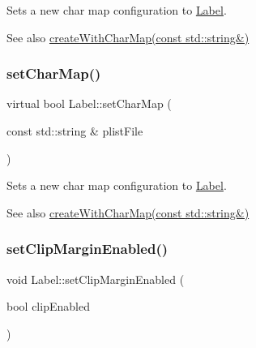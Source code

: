 Sets a new char map configuration to \hyperlink{classLabel}{Label}.

\begin{DoxySeeAlso}{See also}
{\ttfamily \hyperlink{classLabel_a169b27372e6b30d70651a01ff561df5d}{create\+With\+Char\+Map(const std\+::string\&)}} 
\end{DoxySeeAlso}
\mbox{\label{classLabel_a7b1ed3468c3144c2813d3270d1cf269b}} 
\subsubsection{\texorpdfstring{set\+Char\+Map()}{setCharMap()}\hspace{0.1cm}{\footnotesize\ttfamily [6/6]}}
{\footnotesize\ttfamily virtual bool Label\+::set\+Char\+Map (\begin{DoxyParamCaption}\item[{const std\+::string \&}]{plist\+File }\end{DoxyParamCaption})\hspace{0.3cm}{\ttfamily [virtual]}}

Sets a new char map configuration to \hyperlink{classLabel}{Label}.

\begin{DoxySeeAlso}{See also}
{\ttfamily \hyperlink{classLabel_a169b27372e6b30d70651a01ff561df5d}{create\+With\+Char\+Map(const std\+::string\&)}} 
\end{DoxySeeAlso}
\mbox{\label{classLabel_ae882e2499324c73c9852fb573aa0de5c}} 
\subsubsection{\texorpdfstring{set\+Clip\+Margin\+Enabled()}{setClipMarginEnabled()}\hspace{0.1cm}{\footnotesize\ttfamily [1/2]}}
{\footnotesize\ttfamily void Label\+::set\+Clip\+Margin\+Enabled (\begin{DoxyParamCaption}\item[{bool}]{clip\+Enabled }\end{DoxyParamCaption})\hspace{0.3cm}{\ttfamily [inline]}}

